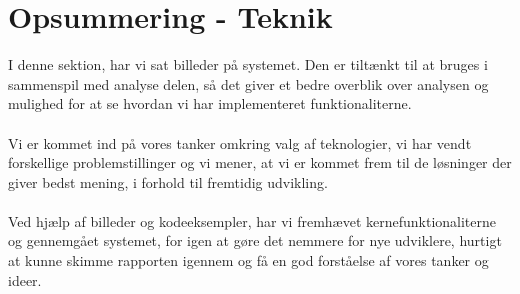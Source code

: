 \hypertarget{teknik}{}
\section{Opsummering - Teknik}
I denne sektion, har vi sat billeder på systemet. Den er tiltænkt til at bruges i sammenspil med analyse delen, så det  giver et bedre overblik over analysen og mulighed for at se
hvordan vi har implementeret funktionaliterne.
\\\\
Vi er kommet ind på vores tanker omkring valg af teknologier, vi har vendt forskellige problemstillinger og vi mener, at vi er kommet frem til de løsninger der giver bedst mening, i forhold til fremtidig udvikling.
\\\\
Ved hjælp af billeder og kodeeksempler, har vi fremhævet kernefunktionaliterne og gennemgået systemet, for igen at gøre det nemmere for nye udviklere, hurtigt at kunne skimme rapporten igennem og få en god forståelse af vores tanker og ideer.
